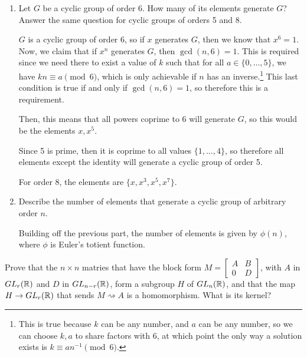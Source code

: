 \documentclass[10pt]{article}
\begin{document}
\begin{problem}
	\begin{enumerate}[label=\alph*)]
		\item Let \( G \) be a cyclic group of order 6. How many of its elements 
			generate \( G \)? Answer the same question for cyclic groups of orders 
			5 and 8. 

			\begin{solution}
				\( G \) is a cyclic group of order 6, so if \( x \) generates
				 \( G \), then we know that \( x^{6} = 1 \). Now, we claim that 
				 if \( x^{n} \) generates \( G \), then \( \gcd(n, 6) = 1 \). This 
				 is required since we need there to exist a value of \( k \) such that 
				 for all \( a \in \{0, \dots, 5\}  \), we have
				 \( kn \equiv a \pmod 6 \), which is only achievable if 
				 \( n \) has an inverse.\footnote{
					 This is true because \( k \) can be any number, and \( a \) can be 
					 any number, so we can choose \( k, a \) to share factors with 6,
					 at which point the only way a solution exists is 
				 \( k \equiv a n^{-1} \pmod 6 \).}
				 This last condition is true if and only 
				 if \( \gcd(n, 6) = 1 \), so therefore this is a requirement. 
				
				 Then, this means that all powers coprime to 6 will generate \( G \), 
				 so this would be the elements \( x, x^{5} \).  

				 Since 5 is prime, then it is coprime to all values 
				 \( \{1, \dots, 4\}  \), so therefore all elements except the identity
				 will generate a cyclic group of order 5. 

				 For order 8, the elements are \( \{x, x^3, x^{5}, x^{7}\}  \). 
			\end{solution}
		\item Describe the number of elements that generate a cyclic group of 
			arbitrary order \( n \). 

			\begin{solution}
				Building off the previous part, the number of elements is 
				given by \( \phi(n) \), where \( \phi \) is Euler's totient function. 
			\end{solution}
	\end{enumerate}
\end{problem}


\begin{problem}
	Prove that the \( n \times n \) matries that have the block form 
	\( M = \begin{bmatrix} A & B \\ 0 & D  \end{bmatrix} \), with 
	\( A \) in \( GL_r(\mathbb R) \) and \( D \) in \( GL_{n - r}(\mathbb R) \), form a subgroup 
	\( H \) of \( GL_n(\mathbb R) \), and that the map \( H \to GL_r(\mathbb R)\) that 
	sends \( M \rightsquigarrow  A \) is a homomorphism. What is its kernel?
\end{problem}
\end{document}
